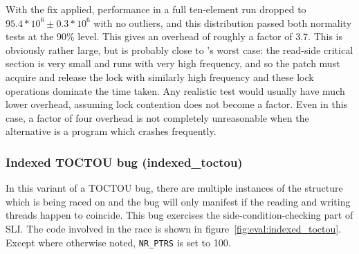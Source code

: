 With the fix applied, performance in a full ten-element run dropped to
$95.4 * 10^6 \pm 0.3 * 10^6$ with no outliers, and this distribution
passed both normality tests at the 90\% level.  This gives an overhead
of roughly a factor of 3.7.  This is obviously rather large, but is
probably close to {\technique}'s worst case: the read-side critical
section is very small and runs with very high frequency, and so the
patch must acquire and release the lock with similarly high frequency
and these lock operations dominate the time taken.  Any realistic test
would usually have much lower overhead, assuming lock contention does
not become a factor.  Even in this case, a factor of four overhead is
not completely unreasonable when the alternative is a program which
crashes frequently.






\subsubsection{Indexed TOCTOU bug (indexed\_toctou)}
\label{sect:eval:indexed_toctou}

In this variant of a TOCTOU bug, there are multiple instances of the
structure which is being raced on and the bug will only manifest if
the reading and writing threads happen to coincide.  This bug
exercises the side-condition-checking part of SLI.  The code involved
in the race is shown in figure~\ref{fig:eval:indexed_toctou}.  Except
where otherwise noted, \verb|NR_PTRS| is set to 100.

